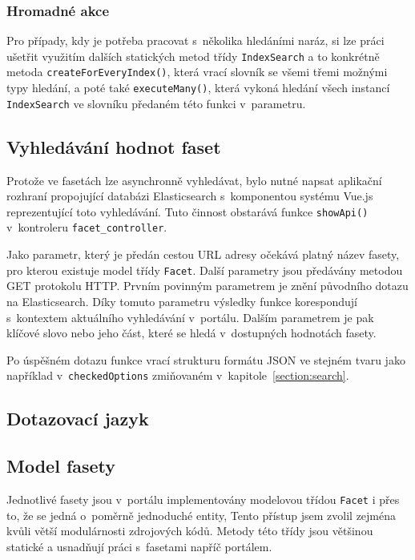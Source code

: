 \subsubsection*{Hromadné akce}
Pro případy, kdy je potřeba pracovat s~několika hledáními naráz, si lze práci ušetřit využitím dalších statických metod třídy \texttt{IndexSearch} a to konkrétně metoda \texttt{createForEveryIndex()}, která vrací slovník se všemi třemi možnými typy hledání, a poté také \texttt{executeMany()}, která vykoná hledání všech instancí \texttt{IndexSearch} ve slovníku předaném této funkci v~parametru. 

\subsection{Vyhledávání hodnot faset}
Protože ve fasetách lze asynchronně vyhledávat, bylo nutné napsat aplikační rozhraní propojující databázi Elasticsearch s~komponentou systému Vue.js reprezentující toto vyhledávání. Tuto činnost obstarává funkce \texttt{showApi()} v~kontroleru \texttt{facet\_controller}.

Jako parametr, který je předán cestou URL adresy očekává platný název fasety, pro kterou existuje model třídy \texttt{Facet}. Další parametry jsou předávány metodou GET protokolu HTTP. Prvním povinným parametrem je znění původního dotazu na Elasticsearch. Díky tomuto parametru výsledky funkce korespondují s~kontextem aktuálního vyhledávání v~portálu. Dalším parametrem je pak klíčové slovo nebo jeho část, které se hledá v~dostupných hodnotách fasety. 

Po úspěšném dotazu funkce vrací strukturu formátu JSON ve stejném tvaru jako například v~\texttt{checkedOptions} zmiňovaném v~kapitole~\ref{section:search}.

\subsection{Dotazovací jazyk}
\blindtext[2]

\subsection{Model fasety}
Jednotlivé fasety jsou v~portálu implementovány modelovou třídou \texttt{Facet} i přes to, že se jedná o~poměrně jednoduché entity, Tento přístup jsem zvolil zejména kvůli větší modulárnosti zdrojových kódů. Metody této třídy jsou většinou statické a usnadňují práci s~fasetami napříč portálem.

